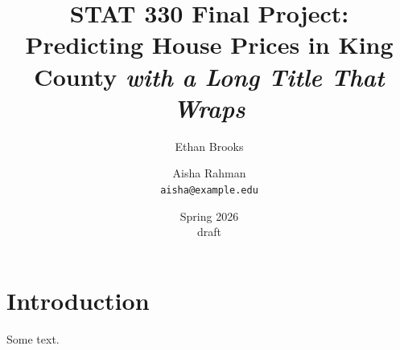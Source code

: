 \documentclass[11pt]{report}
\title{\bfseries STAT 330 Final Project:\\Predicting House Prices in King County \itshape with a Long Title That Wraps}
\author{Ethan Brooks \and Aisha Rahman\\[2pt]\texttt{aisha@example.edu}}
\date{Spring 2026\\\small draft}
\begin{document}
\maketitle
\chapter{Introduction}
Some text.
\end{document}
